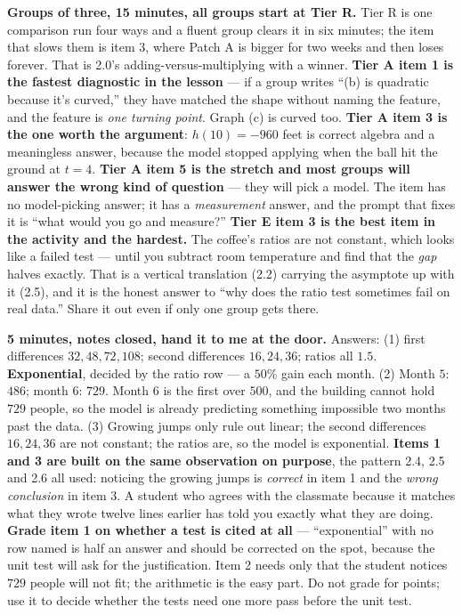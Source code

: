 \documentclass[10pt]{article}
\begin{document}
\boxguard[18]
\begin{teachernote}
    \textbf{Groups of three, 15 minutes, all groups start at Tier R.} Tier R is one comparison run
    four ways and a fluent group clears it in six minutes; the item that slows them is item 3, where
    Patch A is bigger for two weeks and then loses forever. That is 2.0's adding-versus-multiplying
    with a winner. \textbf{Tier A item 1 is the fastest diagnostic in the lesson} --- if a group
    writes ``(b) is quadratic because it's curved,'' they have matched the shape without naming the
    feature, and the feature is \emph{one turning point}. Graph (c) is curved too. \textbf{Tier A item
    3 is the one worth the argument}: $h(10)=-960$ feet is correct algebra and a meaningless answer,
    because the model stopped applying when the ball hit the ground at $t=4$. \textbf{Tier A item 5 is
    the stretch and most groups will answer the wrong kind of question} --- they will pick a model.
    The item has no model-picking answer; it has a \emph{measurement} answer, and the prompt that
    fixes it is ``what would you go and measure?'' \textbf{Tier E item 3 is the best item in the
    activity and the hardest.} The coffee's ratios are not constant, which looks like a failed test
    --- until you subtract room temperature and find that the \emph{gap} halves exactly. That is a
    vertical translation (2.2) carrying the asymptote up with it (2.5), and it is the honest answer to
    ``why does the ratio test sometimes fail on real data.'' Share it out even if only one group gets
    there.
\end{teachernote}

\boxguard[18]
\begin{teachernote}
    \textbf{5 minutes, notes closed, hand it to me at the door.} Answers: (1) first differences
    $32, 48, 72, 108$; second differences $16, 24, 36$; ratios all $1.5$. \textbf{Exponential},
    decided by the ratio row --- a $50\%$ gain each month. (2) Month $5$: $486$; month $6$: $729$.
    Month $6$ is the first over $500$, and the building cannot hold $729$ people, so the model is
    already predicting something impossible two months past the data. (3) Growing jumps only rule out
    linear; the second differences $16, 24, 36$ are not constant; the ratios are, so the model is
    exponential. \textbf{Items 1 and 3 are built on the same observation on purpose}, the pattern 2.4,
    2.5 and 2.6 all used: noticing the growing jumps is \emph{correct} in item 1 and the \emph{wrong
    conclusion} in item 3. A student who agrees with the classmate because it matches what they wrote
    twelve lines earlier has told you exactly what they are doing. \textbf{Grade item 1 on whether a
    test is cited at all} --- ``exponential'' with no row named is half an answer and should be
    corrected on the spot, because the unit test will ask for the justification. Item 2 needs only
    that the student notices $729$ people will not fit; the arithmetic is the easy part. Do not grade
    for points; use it to decide whether the tests need one more pass before the unit test.
\end{teachernote}
\end{document}
